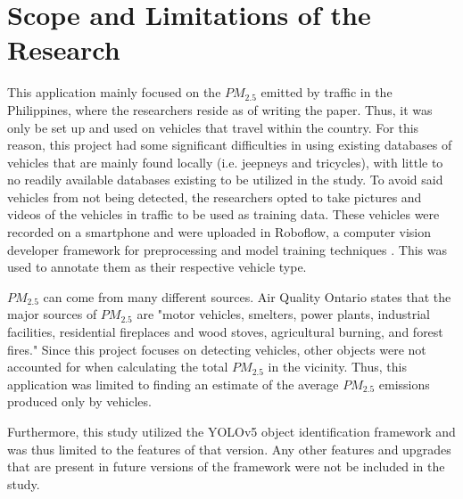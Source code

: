 \section{Scope and Limitations of the Research}
\label{sec:scopelimitations}
This application mainly focused on the  $PM_{2.5}$ emitted by traffic in the Philippines, where the researchers reside as of writing the paper. Thus, it was only be set up and used on vehicles that travel within the country. For this reason, this project had some significant difficulties in using existing databases of vehicles that are mainly found locally (i.e. jeepneys and tricycles), with little to no readily available databases existing to be utilized in the study. To avoid said vehicles from not being detected, the researchers opted to take pictures and videos of the vehicles in traffic to be used as training data. These vehicles were recorded on a smartphone and were uploaded in Roboflow, a computer vision developer framework for  preprocessing and model training techniques \cite{Bhattacharyya_2020}. This was used to annotate them as their respective vehicle type. 


 $PM_{2.5}$ can come from many different sources. Air Quality Ontario \citeyear{MECP_nd} states that the major sources of  $PM_{2.5}$ are "motor vehicles, smelters, power plants, industrial facilities, residential fireplaces and wood stoves, agricultural burning, and forest fires." Since this project focuses on detecting vehicles, other objects were not accounted for when calculating the total $PM_{2.5}$ in the vicinity. Thus, this application was limited to finding an estimate of the average $PM_{2.5}$ emissions produced only by vehicles.

Furthermore, this study utilized the YOLOv5 object identification framework and was thus limited to the features of that version. Any other features and upgrades that are present in future versions of the framework were not be included in the study. 



\begin{comment}

%
%
Generally, one paragraph should be allotted for each of your research objectives.

Each paragraph contains a brief overview of the concept/theory and the purpose of doing the associated objective.

Each paragraph also includes a description of the scope/limitation of your study.

* Please refer to the slides for examples.

\end{comment}


